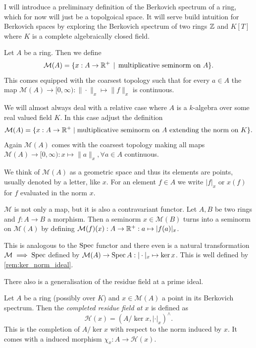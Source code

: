 

I will introduce a preliminary definition of the Berkovich spectrum of a ring, which for now will just be a topolgoical space. 
It will serve build intuition for Berkovich spaces by exploring the Berkovich spectrum of two rings $\mathbb{Z}$ and $K[T]$ where $K$ is a complete algebraically closed field. 

\begin{definition}
	Let $A$ be a ring. Then we define \[
		\mathcal{M} (A) = \{x: A \to \R^{+} \st \text{multiplicative seminorm on } A\} 
	.\] 
	This comes equipped with the coarsest topology such that for every $a \in A$ the map $\mathcal{M} (A) \to [0, \infty) : \|\cdot \|_x \mapsto \|f\|_x $ is continuous. 

	We will almost always deal with a relative case where $A$ is a $k$-algebra over some real valued field $K$. In this case adjust the definition \[
		\mathcal{M} (A) = \{x : A \to \mathbb{R}^{ + }  \mid \text{multiplicative seminorm on }A \text{ extending the norm on } K\} 
	.\] 
	Again $\mathcal{M} (A)$ comes with the coarsest topology making all maps $\mathcal{M} (A) \to [0, \infty): x \mapsto \|a\|_x, \forall a \in A$ continuous. 
\end{definition}
We think of $\mathcal{M} (A)$ as a geometric space and thus its elements are points, usually denoted by a letter, like $x$. 
For an element $f \in A$ we write $|f|_x$ or $x(f)$ for  $f$ evaluated in the norm $x$. 

\begin{remark}
	$\mathcal{M}$ is not only a map, but it is also a contravariant functor. 
	Let $A, B$ be two rings and $f: A \to B$ a morphism. 
	Then a seminorm $x \in \mathcal{M} (B)$ turns into a seminorm on $\mathcal{M} (A)$ by defining $\mathcal{M} (f)(x): A \to \mathbb{R}^{ +}: a \mapsto |f(a)|_x$.


This is analogous to the $\operatorname{Spec}$ functor and there even is a natural transformation $\mathcal{M} \implies \operatorname{Spec}$ defined by $\mathcal{M} (A) \to \operatorname{Spec} A: |\cdot |_x \mapsto \ker x$. This is well defined by \cref{rem:ker_norm_ideal}. 
\end{remark}

There also is a generalisation of the residue field at a prime ideal. 

\begin{definition}\label{def:completed_residue_field}
	Let $A$ be a ring (possibly over $K$) and $x \in \mathcal{M} (A)$ a point in its Berkovich spectrum. 
	Then the \emph{completed residue field at $x$} is defined as \[
		\mathcal{H} (x) = (A / \ker x, |\cdot |_x)^{\wedge}
	.\] 
	This is the completion of $A / \ker x$ with respect to the norm induced by $x$. 
	It comes with a induced morphism $\chi_x: A \to \mathcal{H} (x)$.
\end{definition}

